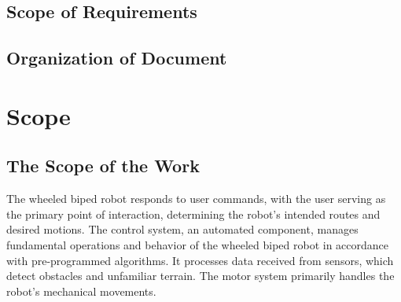 \documentclass[12pt]{article}
\begin{document}
    \subsection{Scope of Requirements}
    \subsection{Organization of Document}

\section{Scope}

\subsection{The Scope of the Work}
The wheeled biped robot responds to user commands, with the user serving as the primary point of interaction, determining the robot's intended routes and desired motions. The control system, an automated component, manages fundamental operations and behavior of the wheeled biped robot in accordance with pre-programmed algorithms. It processes data received from sensors, which detect obstacles and unfamiliar terrain. The motor system primarily handles the robot's mechanical movements.
\end{document}
